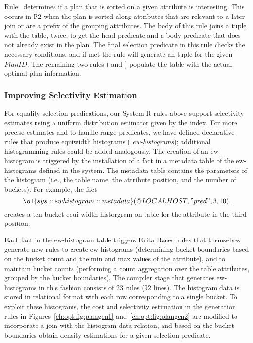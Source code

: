 Rule~ determines if a plan that is sorted on a given attribute is
interesting.  This occurs in P2 when the plan is sorted along attributes that
are relevant to a later join or are a prefix of the grouping attributes.  The
body of this rule joins a  tuple with the  table, twice,
to get the head predicate and a body predicate that does not already exist in
the plan.  The final selection predicate in this rule checks the necessary
conditions, and if met the rule will generate an  tuple
for the given $PlanID$.  The remaining two rules ( and )
populate the  table with the actual optimal plan information.

\subsubsection{Improving Selectivity Estimation}

For equality selection predications, our System R rules above support
selectivity estimates using a uniform distribution estimator given by the
index.  For more precise estimates and to handle range predicates, we have
defined declarative rules that produce equiwidth histograms ({\em
ew-histograms}); additional histogramming rules could be added analogously.
The creation of an ew-histogram is triggered by the installation of a fact in a
metadata table of the ew-histograms defined in the system.  The metadata table
contains the parameters of the histogram (i.e., the table name, the attribute
position, and the number of buckets).  For example, the fact \[
\ol{sys::ewhistogram::metadata}(@LOCALHOST, "pred", 3, 10).  \] creates a ten
bucket equi-width historgram on table  for the attribute in the third
position.

Each fact in the ew-histogram table triggers Evita Raced rules that themselves
generate new rules to create ew-histograms (determining bucket boundaries based
on the bucket count and the min and max values of the attribute), and to
maintain bucket counts (performing a count aggregation over the table
attributes, grouped by the bucket boundaries).  The compiler stage that
generates ew-histograms in this fashion consists of $23$ rules ($92$ lines).
The histogram data is stored in relational format with each row corresponding
to a single bucket.  To exploit these histograms, the cost and selectivity
estimation in the  generation rules in
Figures~\ref{ch:opt:fig:plangen1} and~\ref{ch:opt:fig:plangen2} are modified to
incorporate a join with the histogram data relation, and based on the bucket
boundaries obtain density estimations for a given selection predicate.

